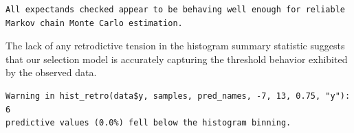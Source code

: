 \documentclass[
  letterpaper,
  DIV=11,
  numbers=noendperiod]{scrartcl}
\newenvironment{Shaded}{\begin{snugshade}}{\end{snugshade}}
\newcommand{\AttributeTok}[1]{\textcolor[rgb]{0.40,0.45,0.13}{#1}}
\newcommand{\ConstantTok}[1]{\textcolor[rgb]{0.56,0.35,0.01}{#1}}
\newcommand{\DecValTok}[1]{\textcolor[rgb]{0.68,0.00,0.00}{#1}}
\newcommand{\FloatTok}[1]{\textcolor[rgb]{0.68,0.00,0.00}{#1}}
\newcommand{\FunctionTok}[1]{\textcolor[rgb]{0.28,0.35,0.67}{#1}}
\newcommand{\NormalTok}[1]{\textcolor[rgb]{0.00,0.23,0.31}{#1}}
\newcommand{\OtherTok}[1]{\textcolor[rgb]{0.00,0.23,0.31}{#1}}
\newcommand{\SpecialCharTok}[1]{\textcolor[rgb]{0.37,0.37,0.37}{#1}}
\newcommand{\StringTok}[1]{\textcolor[rgb]{0.13,0.47,0.30}{#1}}
\begin{document}
\begin{Shaded}
\end{Shaded}

\begin{verbatim}
All expectands checked appear to be behaving well enough for reliable
Markov chain Monte Carlo estimation.
\end{verbatim}

The lack of any retrodictive tension in the histogram summary statistic
suggests that our selection model is accurately capturing the threshold
behavior exhibited by the observed data.

\begin{Shaded}
\end{Shaded}

\begin{verbatim}
Warning in hist_retro(data$y, samples, pred_names, -7, 13, 0.75, "y"): 6
predictive values (0.0%) fell below the histogram binning.
\end{verbatim}
\end{document}

